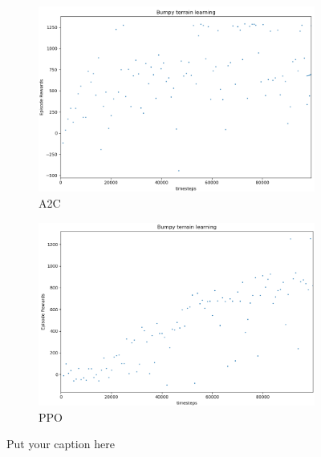 \documentclass{article}
\begin{document}
\begin{figure}[ht]
\begin{subfigure}{.5\textwidth}
  \centering
  \includegraphics[width=.95\linewidth]{figc/Bumpy_terrain_learning_100ep_a2c.png}  
  \caption{A2C}
  \label{fig:sub-first}
\end{subfigure}
\begin{subfigure}{.5\textwidth}
  \centering
  \includegraphics[width=.95\linewidth]{figc/Bumpy_terrain_learning_100ep_ppo.png}  
  \caption{PPO}
  \label{fig:sub-second}
\end{subfigure}
\caption{Put your caption here}
\label{fig:fig}
\end{figure}
\end{document}
